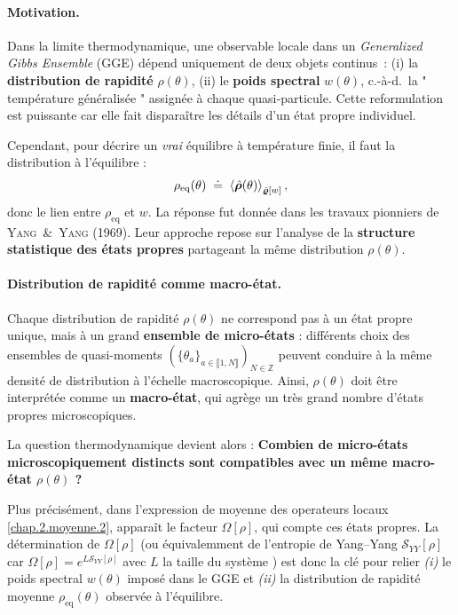 \paragraph{Motivation.}

Dans la limite thermodynamique, une observable locale dans un \textit{Generalized Gibbs Ensemble} (GGE) dépend uniquement de deux objets continus :  (i)  la \textbf{distribution de rapidité} $\rho(\theta)$, (ii) le \textbf{poids spectral} $w(\theta)$, c.-à-d.\ la " température généralisée " assignée à chaque quasi‑particule.
Cette reformulation est puissante car elle fait disparaître les détails d’un état propre individuel.  

\medskip
Cependant, pour décrire un \emph{vrai} équilibre à température finie, il faut la distribution à l'équilibre :
\begin{eqnarray}\label{chap.2:eq.rho.eq.1}
	\rho_{\mathrm{eq}}(\theta)\;\doteq\;\braket{\hat{\bm{\rho}}(\theta)}_{\hat{\bm{\varrho}}[w]}	,  
\end{eqnarray}
donc le lien entre $\rho_{\mathrm{eq}}$ et $w$.
La réponse fut donnée dans les travaux pionniers de \textsc{Yang \& Yang} (1969).  
Leur approche repose sur l’analyse de la \textbf{structure statistique des états propres} partageant la même distribution $\rho(\theta)$.


\paragraph{Distribution de rapidité comme macro-état.}

Chaque distribution de rapidité $\rho(\theta)$ ne correspond pas à un état propre unique, mais à un grand {\bf ensemble de micro-états} : différents choix des ensembles de quasi-moments $(\{\theta_a\}_{a \in \llbracket 1 , N \rrbracket })_{N \in \mathbb{Z}} $ peuvent conduire à la même densité de distribution à l’échelle macroscopique. Ainsi, $\rho(\theta)$ doit être interprétée comme un {\bf macro-état}, qui agrège un très grand nombre d’états propres microscopiques.

La question thermodynamique devient alors : {\bf Combien de micro-états microscopiquement distincts sont compatibles avec un même macro-état $\rho(\theta)$ ?} 

\medskip
Plus précisément, dans l’expression de moyenne des operateurs locaux \eqref{chap.2.moyenne.2}, apparaît le facteur
\(
\Omega[\rho]
\),
qui compte ces états propres.  
La détermination de $\Omega[\rho]$ (ou équivalemment de l’entropie de Yang–Yang $\mathcal{S}_{YY}[\rho]$ car 
\(
\Omega[\rho] = e^{L\mathcal{S}_{YY}[\rho]}
\)
avec $L$ la taille du système
) est donc la clé pour relier \emph{(i)} le poids spectral $w(\theta)$ imposé dans le GGE et \emph{(ii)} la distribution de rapidité moyenne $\rho_{\mathrm{eq}}(\theta)$ observée à l’équilibre.

